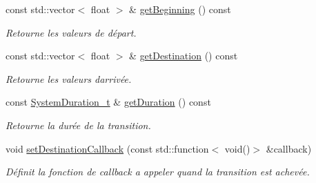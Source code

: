\begin{DoxyCompactItemize}
const std\+::vector$<$ float $>$ \& \hyperlink{classns_transition_1_1_transition_contract_a8dc505c54df5d1f09a482a1b56676cd4}{get\+Beginning} () const
\begin{DoxyCompactList}\small\item\em Retourne les valeurs de départ. \end{DoxyCompactList}\item 
const std\+::vector$<$ float $>$ \& \hyperlink{classns_transition_1_1_transition_contract_ae4ce420a4376e1d372efb3fd046410df}{get\+Destination} () const
\begin{DoxyCompactList}\small\item\em Retourne les valeurs d\textquotesingle{}arrivée. \end{DoxyCompactList}\item 
const \hyperlink{namespacens_transition_a260258f249f46ff9a62da721537f87af}{System\+Duration\+\_\+t} \& \hyperlink{classns_transition_1_1_transition_contract_a9b900986c8f271729f99c88fa1b0a5e1}{get\+Duration} () const
\begin{DoxyCompactList}\small\item\em Retourne la durée de la transition. \end{DoxyCompactList}\item 
void \hyperlink{classns_transition_1_1_transition_contract_a8f1ebafd9966553678fd7845f35bac33}{set\+Destination\+Callback} (const std\+::function$<$ void()$>$ \&callback)
\begin{DoxyCompactList}\small\item\em Définit la fonction de callback a appeler quand la transition est achevée. \end{DoxyCompactList}\end{DoxyCompactItemize}

